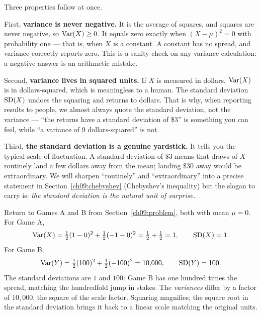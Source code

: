 Three properties follow at once.

First, \textbf{variance is never negative.} It is the average of squares, and
squares are never negative, so $\operatorname{Var}(X) \ge 0$. It equals zero
exactly when $(X-\mu)^2 = 0$ with probability one --- that is, when $X$ is a
constant. A constant has no spread, and variance correctly reports zero. This
is a sanity check on any variance calculation: a negative answer is an arithmetic mistake.

Second, \textbf{variance lives in squared units.} If $X$ is measured in
dollars, $\operatorname{Var}(X)$ is in dollars-squared, which is meaningless to a human. The
standard deviation $\operatorname{SD}(X)$ undoes the squaring and returns to dollars. That
is why, when reporting results to people, we almost always quote the standard
deviation, not the variance --- ``the returns have a standard deviation of
\$3'' is something you can feel, while ``a variance of 9 dollars-squared'' is
not.

Third, \textbf{the standard deviation is a genuine yardstick.} It tells you
the typical scale of fluctuation. A standard deviation of $\$3$ means that
draws of $X$ routinely land a few dollars away from the mean; landing
$\$30$ away would be extraordinary. We will sharpen ``routinely'' and
``extraordinary'' into a precise statement in Section~\ref{ch09:chebyshev}
(Chebyshev's inequality) but the slogan to carry is: \emph{the standard
deviation is the natural unit of surprise.}

\begin{example}
\label{ch09:ex-twogames}
Return to Games A and B from Section~\ref{ch09:problem}, both with mean
$\mu=0$.
For Game A,
\[
  \operatorname{Var}(X) = \tfrac12(1-0)^2 + \tfrac12(-1-0)^2 = \tfrac12 + \tfrac12 = 1,
  \qquad \operatorname{SD}(X) = 1.
\]
For Game B,
\[
  \operatorname{Var}(Y) = \tfrac12(100)^2 + \tfrac12(-100)^2 = 10{,}000,
  \qquad \operatorname{SD}(Y) = 100.
\]
The standard deviations are $1$ and $100$: Game B has one hundred times
the spread, matching the hundredfold jump in stakes. The \emph{variances} differ by a factor of $10{,}000$, the square of the scale
factor. Squaring magnifies; the square root in the standard deviation brings
it back to a linear scale matching the original units.
\end{example}

